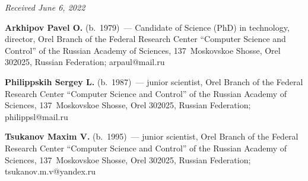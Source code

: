 \vspace*{-6pt}

\hfill{\small\textit{Received June 6, 2022}}

\Contr

\noindent
\textbf{Arkhipov Pavel O.} (b.\ 1979)~--- Candidate of Science (PhD) in technology, director, Orel 
Branch of the Federal Research Center ``Computer Science and Control'' of the Russian Academy 
of Sciences, 137~Moskovskoe Shosse, Orel 302025, Russian Federation; \mbox{arpaul@mail.ru}

\vspace*{3pt}

\noindent
\textbf{Philippskih Sergey L.} (b.\ 1987)~--- junior scientist, Orel Branch of the Federal Research 
Center ``Computer Science and Control'' of the Russian Academy of Sciences, 137~Moskovskoe 
Shosse, Orel 302025, Russian Federation; \mbox{philippsl@mail.ru}

\vspace*{3pt}

\noindent
\textbf{Tsukanov Maxim V.} (b.\ 1995)~--- junior scientist, Orel Branch of the Federal Research 
Center ``Computer Science and Control'' of the Russian Academy of Sciences, 137~Moskovskoe 
Shosse, Orel 302025, Russian Federation; \mbox{tsukanov.m.v@yandex.ru}


\label{end\stat}

\renewcommand{\bibname}{\protect\rm Литература} 